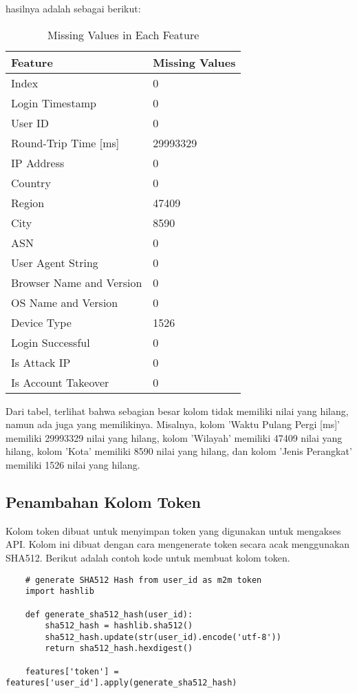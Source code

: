hasilnya adalah sebagai berikut:

\begin{table}[H]
    \centering
    \begin{tabular}{|l|l|}
    \hline
    \textbf{Feature} & \textbf{Missing Values} \\ \hline
    Index & 0 \\ 
    Login Timestamp & 0 \\ 
    User ID & 0 \\ 
    Round-Trip Time [ms] & 29993329 \\ 
    IP Address & 0 \\ 
    Country & 0 \\ 
    Region & 47409 \\ 
    City & 8590 \\ 
    ASN & 0 \\ 
    User Agent String & 0 \\ 
    Browser Name and Version & 0 \\ 
    OS Name and Version & 0 \\ 
    Device Type & 1526 \\ 
    Login Successful & 0 \\ 
    Is Attack IP & 0 \\ 
    Is Account Takeover & 0 \\ \hline
    \end{tabular}
    \caption{Missing Values in Each Feature}
    \label{tab:missing_values}
    \end{table}

Dari tabel, terlihat bahwa sebagian besar kolom tidak memiliki nilai yang hilang, namun ada juga yang memilikinya. Misalnya, kolom 'Waktu Pulang Pergi [ms]' memiliki 29993329 nilai yang hilang, kolom 'Wilayah' memiliki 47409 nilai yang hilang, kolom 'Kota' memiliki 8590 nilai yang hilang, dan kolom 'Jenis Perangkat' memiliki 1526 nilai yang hilang.

\subsection{Penambahan Kolom Token}
Kolom token dibuat untuk menyimpan token yang digunakan untuk mengakses API. Kolom ini dibuat dengan cara mengenerate token secara acak menggunakan SHA512. Berikut adalah contoh kode untuk membuat kolom token.

\begin{lstlisting}
    # generate SHA512 Hash from user_id as m2m token
    import hashlib

    def generate_sha512_hash(user_id):
        sha512_hash = hashlib.sha512()
        sha512_hash.update(str(user_id).encode('utf-8'))
        return sha512_hash.hexdigest()

    features['token'] = features['user_id'].apply(generate_sha512_hash)
    \end{lstlisting}

